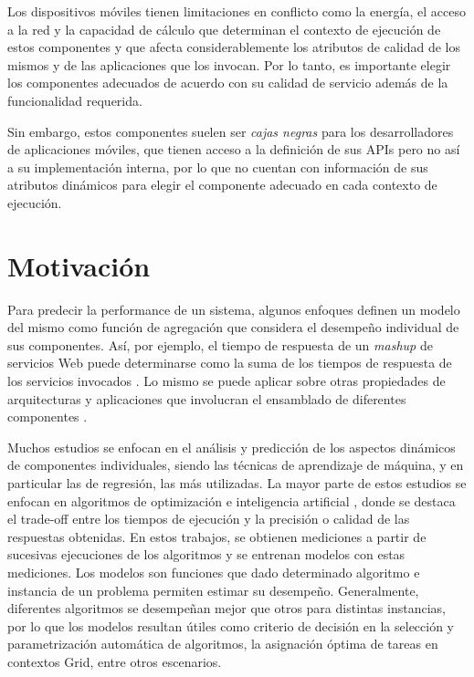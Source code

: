 Los dispositivos móviles tienen limitaciones en conflicto como la
energía, el acceso a la red y la capacidad de cálculo que determinan
el contexto de ejecución de estos componentes y que afecta considerablemente
los atributos de calidad de los mismos y de las aplicaciones que los
invocan. Por lo tanto, es importante elegir los componentes adecuados
de acuerdo con su calidad de servicio además de la funcionalidad requerida. 

Sin embargo, estos componentes suelen ser \emph{cajas negras} para
los desarrolladores de aplicaciones móviles, que tienen acceso a la
definición de sus \ac{API}s pero no así a su implementación interna,
por lo que no cuentan con información de sus atributos dinámicos para
elegir el componente adecuado en cada contexto de ejecución.


\section{Motivación\label{sec:Motivaci=0000F3n}}

Para predecir la performance de un sistema, algunos enfoques definen
un modelo del mismo como función de agregación que considera el desempeño
individual de sus componentes. Así, por ejemplo, el tiempo de respuesta
de un \emph{mashup} de servicios Web puede determinarse como la suma
de los tiempos de respuesta de los servicios invocados \cite{Rosenberg2009}.
Lo mismo se puede aplicar sobre otras propiedades de arquitecturas
y aplicaciones que involucran el ensamblado de diferentes componentes
\cite{Crnkovic2011}\cite{Sanchez2015}. 

Muchos estudios se enfocan en el análisis y predicción de los aspectos
dinámicos de componentes individuales, siendo las técnicas de aprendizaje
de máquina, y en particular las de regresión, las más utilizadas.
La mayor parte de estos estudios se enfocan en algoritmos de optimización
e inteligencia artificial \cite{Hutter2014}, donde se destaca el
trade-off entre los tiempos de ejecución y la precisión o calidad
de las respuestas obtenidas. En estos trabajos, se obtienen mediciones
a partir de sucesivas ejecuciones de los algoritmos y se entrenan
modelos con estas mediciones. Los modelos son funciones que dado determinado
algoritmo e instancia de un problema permiten estimar su desempeño.
Generalmente, diferentes algoritmos se desempeñan mejor que otros
para distintas instancias, por lo que los modelos resultan útiles
como criterio de decisión en la selección y parametrización automática
de algoritmos, la asignación óptima de tareas en contextos Grid, entre
otros escenarios. 

